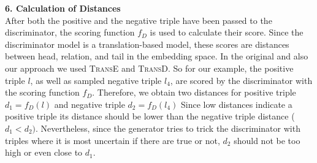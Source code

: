 \textbf{6. Calculation of Distances}\\
%
After both the positive and the negative triple have been passed to the discriminator, the scoring function $f_D$ is used to calculate their score.
Since the discriminator model is a translation-based model, these scores are distances between head, relation, and tail in the embedding space.
In the original \kbgan and also our approach we used \textsc{TransE} and \textsc{TransD}.
So for our example, the positive triple $l$, as well as sampled negative triple $l_4$, are scored by the discriminator with the scoring function $f_D$.
Therefore, we obtain two distances for positive triple $d_1 = f_D(l)$ and negative triple $d_2 = f_D(l_4)$
Since low distances indicate a positive triple its distance should be lower than the negative triple distance ($d_1 < d_2)$.
Nevertheless, since the generator tries to trick the discriminator with triples where it is most uncertain if there are true or not, $d_2$ should not be too high or even close to $d_1$.
